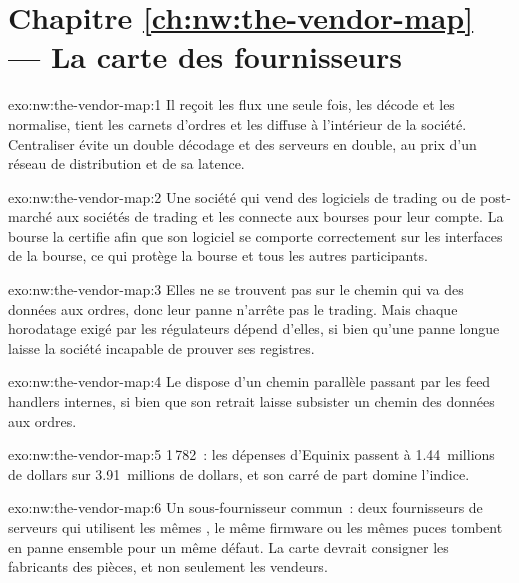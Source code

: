 \section*{Chapitre \ref{ch:nw:the-vendor-map} --- La carte des fournisseurs}

\begin{solution}{exo:nw:the-vendor-map:1}
Il reçoit les flux une seule fois, les décode et les normalise, tient les carnets d'ordres et les diffuse à l'intérieur de la société. Centraliser évite un double décodage et des serveurs en double, au prix
d'un réseau de distribution et de sa latence.
\end{solution}

\begin{solution}{exo:nw:the-vendor-map:2}
Une société qui vend des logiciels de trading ou de post-marché aux sociétés de trading et les connecte aux bourses pour leur compte. La bourse la certifie
afin que son logiciel se comporte correctement sur les interfaces de la bourse, ce qui protège la bourse et tous les autres participants.
\end{solution}

\begin{solution}{exo:nw:the-vendor-map:3}
Elles ne se trouvent pas sur le chemin qui va des données aux ordres, donc leur panne n'arrête pas le trading. Mais chaque horodatage exigé par les régulateurs
dépend d'elles, si bien qu'une panne longue laisse la société incapable de prouver ses registres.
\end{solution}

\begin{solution}{exo:nw:the-vendor-map:4}
Le  dispose d'un chemin parallèle passant par les feed handlers internes, si bien que son retrait laisse subsister un chemin des données aux ordres.
\end{solution}

\begin{solution}{exo:nw:the-vendor-map:5}
1\,782~: les dépenses d'Equinix passent à 1.44~millions de dollars sur 3.91~millions de dollars, et son carré de part domine l'indice.
\end{solution}

\begin{solution}{exo:nw:the-vendor-map:6}
Un sous-fournisseur commun~: deux fournisseurs de serveurs qui utilisent les mêmes , le même firmware ou les mêmes puces tombent en panne ensemble pour un même défaut. La carte
devrait consigner les fabricants des pièces, et non seulement les vendeurs.
\end{solution}

